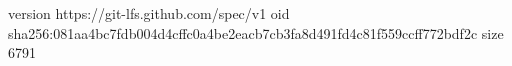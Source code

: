 version https://git-lfs.github.com/spec/v1
oid sha256:081aa4bc7fdb004d4cffc0a4be2eacb7cb3fa8d491fd4c81f559ccff772bdf2c
size 6791
